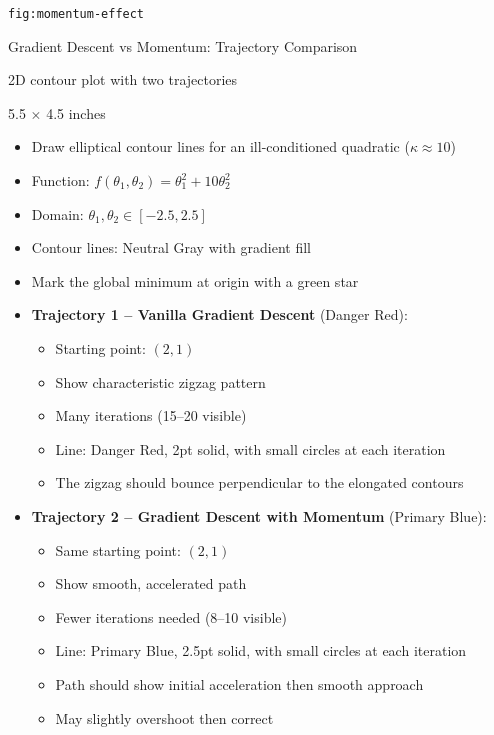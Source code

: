 \documentclass[12pt]{article}
\begin{document}
\begin{description}[style=nextline, leftmargin=0pt]
    \item[Figure ID] \texttt{fig:momentum-effect}
    \item[Title] Gradient Descent vs Momentum: Trajectory Comparison
    \item[Type] 2D contour plot with two trajectories
    \item[Size] 5.5 $\times$ 4.5 inches

    \item[Visual Description]
    \begin{itemize}
        \item Draw elliptical contour lines for an ill-conditioned quadratic ($\kappa \approx 10$)
        \item Function: $f(\theta_1, \theta_2) = \theta_1^2 + 10\theta_2^2$
        \item Domain: $\theta_1, \theta_2 \in [-2.5, 2.5]$
        \item Contour lines: Neutral Gray with gradient fill
        \item Mark the global minimum at origin with a green star

        \item \textbf{Trajectory 1 -- Vanilla Gradient Descent} (Danger Red):
        \begin{itemize}
            \item Starting point: $(2, 1)$
            \item Show characteristic zigzag pattern
            \item Many iterations (15--20 visible)
            \item Line: Danger Red, 2pt solid, with small circles at each iteration
            \item The zigzag should bounce perpendicular to the elongated contours
        \end{itemize}

        \item \textbf{Trajectory 2 -- Gradient Descent with Momentum} (Primary Blue):
        \begin{itemize}
            \item Same starting point: $(2, 1)$
            \item Show smooth, accelerated path
            \item Fewer iterations needed (8--10 visible)
            \item Line: Primary Blue, 2.5pt solid, with small circles at each iteration
            \item Path should show initial acceleration then smooth approach
            \item May slightly overshoot then correct
        \end{itemize}


\end{itemize}
\end{description}
\end{document}
